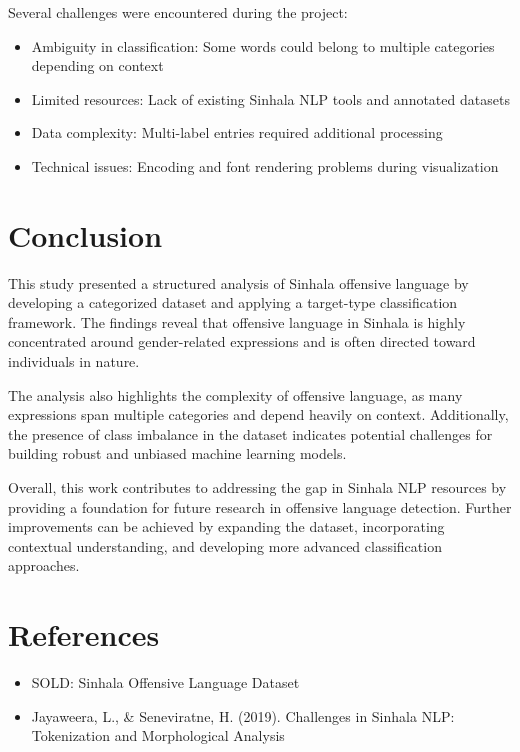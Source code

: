 \documentclass[12pt]{article}
\begin{document}
Several challenges were encountered during the project:

\begin{itemize}
    \item Ambiguity in classification: Some words could belong to multiple categories depending on context
    \item Limited resources: Lack of existing Sinhala NLP tools and annotated datasets
    \item Data complexity: Multi-label entries required additional processing
    \item Technical issues: Encoding and font rendering problems during visualization
\end{itemize}

\section{Conclusion}

This study presented a structured analysis of Sinhala offensive language by developing a categorized dataset and applying a target-type classification framework. The findings reveal that offensive language in Sinhala is highly concentrated around gender-related expressions and is often directed toward individuals in nature.

The analysis also highlights the complexity of offensive language, as many expressions span multiple categories and depend heavily on context. Additionally, the presence of class imbalance in the dataset indicates potential challenges for building robust and unbiased machine learning models.

Overall, this work contributes to addressing the gap in Sinhala NLP resources by providing a foundation for future research in offensive language detection. Further improvements can be achieved by expanding the dataset, incorporating contextual understanding, and developing more advanced classification approaches.

\section{References}


\begin{itemize}
    \item SOLD: Sinhala Offensive Language Dataset
    \item Jayaweera, L., \& Seneviratne, H. (2019). Challenges in Sinhala NLP: Tokenization and Morphological Analysis
\end{itemize}
\end{document}
